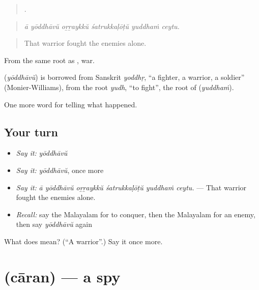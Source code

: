 \begin{quote}
     .
\end{quote}

\begin{quote}
\emph{ā yōddhāvŭ oṟṟaykkŭ śatrukkaḷōṭŭ yuddhaṁ ceytu.}
\end{quote}

\begin{quote}
That warrior fought the enemies alone.
\end{quote}

From the same root as , war.

\begin{cousinweb}
\textbf{} (\emph{yōddhāvŭ}) is borrowed from Sanskrit \emph{yoddhṛ}, \textquotedblleft{}a fighter, a warrior, a soldier\textquotedblright{} (Monier-Williams), from the root \emph{yudh}, \textquotedblleft{}to fight\textquotedblright{}, the root of  (\emph{yuddhaṁ}).
\end{cousinweb}

\begin{grammarlens}[title={What you've built}]
One more word for telling what happened.
\end{grammarlens}

\subsection*{Your turn}
\begin{itemize}
\raggedright
  \item \emph{Say it:} \emph{yōddhāvŭ}
  \item \emph{Say it:} \emph{yōddhāvŭ}, once more
  \item \emph{Say it:} \emph{ā yōddhāvŭ oṟṟaykkŭ śatrukkaḷōṭŭ yuddhaṁ ceytu.} — That warrior fought the enemies alone.
  \item \emph{Recall:} say the Malayalam for to conquer, then the Malayalam for an enemy, then say \emph{yōddhāvŭ} again
\end{itemize}

\begin{tcolorbox}[breakable,colback=teal!4,colframe=teal!35!black,title={Before you move on}]
What does  mean? (\textquotedblleft{}A warrior\textquotedblright{}.) Say it once more.
\end{tcolorbox}
\section[\texorpdfstring{\ml{ചാരൻ} (cāran)}{ചാരൻ (cāran)}]{ (cāran) — a spy}

